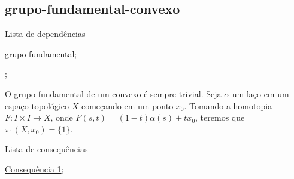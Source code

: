 \subsection{grupo-fundamental-convexo}
\label{grupo-fundamental-convexo}
\begin{titlemize}{Lista de dependências}
	\item \hyperref[grupo-fundamental-def]{grupo-fundamental};\\ %
	\item \hyperref[]{};\\
\end{titlemize}

\begin{ex}
O grupo fundamental de um convexo é sempre trivial. Seja $\alpha$ um laço em um espaço topológico $X$ começando em um ponto $x_0$.
Tomando a homotopia $F:I \times I \longrightarrow X$, onde $F(s,t) = (1 - t)\alpha(s) + tx_0$, teremos que $\pi_1(X, x_0) = \{1\}$.
\end{ex}



\begin{titlemize}{Lista de consequências}
	\item \hyperref[consequencia1]{Consequência 1};\\ %
	\item \hyperref[]{}
\end{titlemize}
